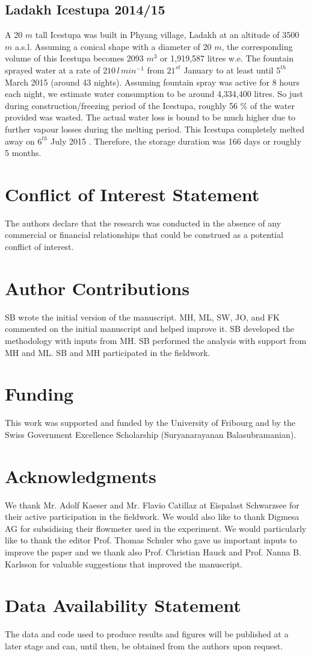 \documentclass[utf8]{frontiersSCNS} %
\begin{document}
\subsection{Ladakh Icestupa 2014/15} \label{section:ladakhloss} A 20 $m$ tall Icestupa \citep{iceheight} was built in
Phyang village, Ladakh at an altitude of 3500 $m$ a.s.l. Assuming a conical shape with a diameter of 20 $m$, the
corresponding volume of this Icestupa becomes 2093 $m^3$ or 1,919,587 litres w.e. The fountain sprayed water at a rate
of $210\, l\,min^{-1}$ \citep{waterinput} from $21^{st}$ January \citep{waterstart} to at least until $5^{th}$ March
2015 \citep{waterend} (around 43 nights). Assuming fountain spray was active for 8 hours each night, we estimate water
consumption to be around 4,334,400 litres. So just during construction/freezing period of the Icestupa, roughly 56 \%
of the water provided was wasted. The actual water loss is bound to be much higher due to further vapour losses during
the melting period. This Icestupa completely melted away on $6^{th}$ July 2015 \citep{iceends}. Therefore, the storage
duration was 166 days or roughly 5 months. 


\section*{Conflict of Interest Statement} The authors declare that the research was conducted in the absence of any
commercial or financial relationships that could be construed as a potential conflict of interest.

\section*{Author Contributions} SB wrote the initial version of the manuscript. MH, ML, SW, JO, and FK commented on
the initial manuscript and helped improve it. SB developed the methodology with inputs from MH. SB performed the
analysis with support from MH and ML. SB and MH participated in the fieldwork.

\section*{Funding} This work was supported and funded by the University of Fribourg and by the Swiss Government
Excellence Scholarship (Suryanarayanan Balasubramanian).

\section*{Acknowledgments} We thank Mr. Adolf Kaeser and Mr. Flavio Catillaz at Eispalast Schwarzsee for their active
participation in the fieldwork. We would also like to thank Digmesa AG for subsidising their flowmeter used in the
experiment. We would particularly like to thank the editor Prof. Thomas Schuler who gave us important inputs to
improve the paper and we thank also Prof. Christian Hauck and Prof. Nanna B. Karlsson for valuable suggestions that
improved the manuscript.


\section*{Data Availability Statement} The data and code used to produce results and figures will be published at a
later stage and can, until then, be obtained from the authors upon request.

 
\end{document}
